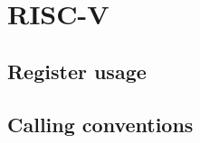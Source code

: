 \chapter{RISC-V}
\label{chapter-backend-risc-v}

\section{Register usage}
\label{sec-backend-risc-v-register-usage}

\section{Calling conventions}
\label{sec-backend-risc-v-calling-conventions}
